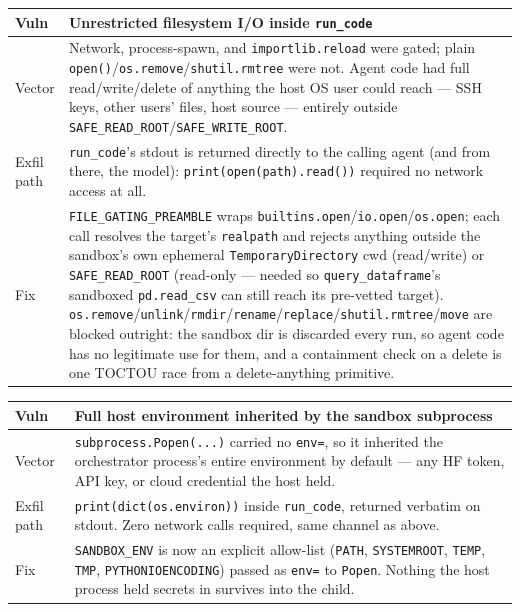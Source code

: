 \documentclass[10pt]{article}
\newcommand{\code}[1]{\texttt{\small #1}}
\newcommand{\tabhead}[1]{\textbf{#1}}
\begin{document}
\vspace{0.4em}
\begin{tabularx}{\textwidth}{@{}l L@{}}
\toprule
\tabhead{Vuln} & \tabhead{Unrestricted filesystem I/O inside \code{run\_code}} \\
\midrule
Vector & Network, process-spawn, and \code{importlib.reload} were gated; plain \code{open()}/\code{os.remove}/\code{shutil.rmtree} were not. Agent code had full read/write/delete of anything the host OS user could reach --- SSH keys, other users' files, host source --- entirely outside \code{SAFE\_READ\_ROOT}/\code{SAFE\_WRITE\_ROOT}. \\
Exfil path & \code{run\_code}'s stdout is returned directly to the calling agent (and from there, the model): \code{print(open(path).read())} required no network access at all. \\
Fix & \code{FILE\_GATING\_PREAMBLE} wraps \code{builtins.open}/\code{io.open}/\code{os.open}; each call resolves the target's \code{realpath} and rejects anything outside the sandbox's own ephemeral \code{TemporaryDirectory} cwd (read/write) or \code{SAFE\_READ\_ROOT} (read-only --- needed so \code{query\_dataframe}'s sandboxed \code{pd.read\_csv} can still reach its pre-vetted target). \code{os.remove}/\code{unlink}/\code{rmdir}/\code{rename}/\code{replace}/\code{shutil.rmtree}/\code{move} are blocked outright: the sandbox dir is discarded every run, so agent code has no legitimate use for them, and a containment check on a delete is one TOCTOU race from a delete-anything primitive. \\
\bottomrule
\end{tabularx}

\vspace{0.4em}
\begin{tabularx}{\textwidth}{@{}l L@{}}
\toprule
\tabhead{Vuln} & \tabhead{Full host environment inherited by the sandbox subprocess} \\
\midrule
Vector & \code{subprocess.Popen(...)} carried no \code{env=}, so it inherited the orchestrator process's entire environment by default --- any HF token, API key, or cloud credential the host held. \\
Exfil path & \code{print(dict(os.environ))} inside \code{run\_code}, returned verbatim on stdout. Zero network calls required, same channel as above. \\
Fix & \code{SANDBOX\_ENV} is now an explicit allow-list (\code{PATH}, \code{SYSTEMROOT}, \code{TEMP}, \code{TMP}, \code{PYTHONIOENCODING}) passed as \code{env=} to \code{Popen}. Nothing the host process held secrets in survives into the child. \\
\bottomrule
\end{tabularx}
\end{document}
